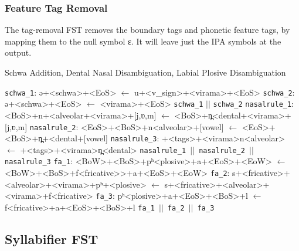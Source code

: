 \documentclass{ieeeaccess}
\begin{document}



\subsubsection{Feature Tag Removal}
\label{tagremoval)}

The tag-removal FST  removes the boundary tags and phonetic feature tags, by mapping them to the null symbol {\ipa ɛ}. It will leave just the IPA symbols at the output.



\begin{algorithm*}[h]
	\caption{Schwa Addition, Dental Nasal Disambiguation,  Labial Plosive Disambiguation}\label{disambiguation2}
	\begin{algorithmic}[1]
		\State \texttt{schwa\_1}: {\ipa ə+<schwa>+<EoS>} $\gets$ {\ipa u+<v\_sign>+<virama>+<EoS>} 
		\State \texttt{schwa\_2}: {\ipa ə+<schwa>+<EoS>} $\gets$ {\ipa <virama>+<EoS>} 
		\State \Return \texttt{schwa\_1} $||$ \texttt{schwa\_2} 
	\EndProcedure
		\State \texttt{nasalrule\_1}:
		{\ipa <BoS>+n+<alveolar+<virama>+[j,ʋ,m]} $\gets$ {\ipa <BoS>+n̪<dental+<virama>+[j,ʋ,m]} 
		\State \texttt{nasalrule\_2}:
		{\ipa <EoS>+<BoS>+n<alveolar>+[vowel]} $\gets$ {\ipa <EoS>+<BoS>+n̪+<dental+[vowel]}
		\State \texttt{nasalrule\_3}: {\ipa [k,ɡʱ,p,m,ʃ,s]+<tags>+<virama>n<alveolar>} $\gets$ {\ipa [k,ɡʱ,p,m,ʃ,s]+<tags>+<virama>n̪<dental>}
		\State \Return \texttt{nasalrule\_1 $||$ nasalrule\_2 $||$ nasalrule\_3} 
	\EndProcedure
		\State \texttt{fa\_1}: {\ipa <BoW>+<BoS>+pʰ<plosive>+a+<EoS>+<EoW>} $\gets$ {\ipa <BoW>+<BoS>+f<fricative>>+a+<EoS>+<EoW>}
		\State \texttt{fa\_2}: {\ipa s+<fricative>+<alveolar>+<virama>+pʰ+<plosive>} $\gets$ {\ipa s+<fricative>+<alveolar>+<virama>+f<fricative>}
		\State \texttt{fa\_3}: {\ipa pʰ<plosive>+a+<EoS>+<BoS>+l} $\gets$ {\ipa f<fricative>+a+<EoS>+<BoS>+l}
		\State \Return \texttt{fa\_1 $||$ fa\_2 $||$ fa\_3} 
	\EndProcedure
	\end{algorithmic}
\end{algorithm*}


\subsection{Syllabifier FST}
\label{syllabification}
\end{document}
